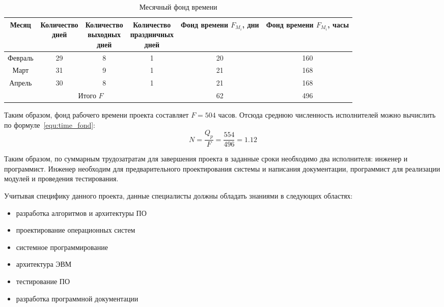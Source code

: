 \begin{table}
  \centering
  \caption{Месячный фонд времени}
  \label{tab:month_time_fond}
  \begin{tabular}{|c|c|c|c|c|c|}
    \hline
	Месяц & \thead{Количество \\ дней} & \thead{Количество \\ выходных \\ дней} &
		\thead{Количество \\ праздничных \\ дней} & \thead{Фонд \\ времени \\ $F_{M_{i}}$, дни} &
		\thead{Фонд \\ времени \\ $F_{M_{i}}$, часы} \\
    \hline
	Февраль & 29 & 8 & 1 & 20 & 160 \\
    \hline
	Март & 31 & 9 & 1 & 21 & 168 \\
    \hline
	Апрель & 30 & 8 & 1 & 21 & 168 \\
    \hline
	\multicolumn{4}{|c|}{Итого $F$} & 62 & 496 \\
    \hline
  \end{tabular}
\end{table}

Таким образом, фонд рабочего времени проекта составляет $F = 504$ часов.
Отсюда среднюю численность исполнителей можно вычислить по формуле~\ref{equ:time_fond}:
\begin{equation}
	N = \frac{Q_{p}}{F} = \frac{554}{496} = 1.12
\label{equ:time_fond}
\end{equation}

Таким образом, по суммарным трудозатратам для завершения проекта в заданные
сроки необходимо два исполнителя: инженер и программист. Инженер необходим для
предварительного проектирования системы и написания документации, программист
для реализации модулей и проведения тестирования.

Учитывая специфику данного проекта, данные специалисты должны обладать
знаниями в следующих областях:
\begin{itemize}
\item разработка алгоритмов и архитектуры ПО
\item проектирование операционных систем
\item системное программирование
\item архитектура ЭВМ
\item тестирование ПО
\item разработка программной документации
\end{itemize}

